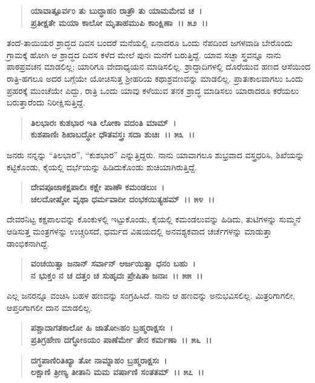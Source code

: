 \begin{verse}
\textbf{ಯಾವಾತ್ಪೂರ್ವಂ ತು ಬುದ್ಧಾಹಂ ರಾತ್ರೌ ತು ಯಾಮಮೇವ ಚ~।}\\\textbf{ಪ್ರತೀಕ್ಷತೇ ಮಯಾ ಕಾಲೋ ಮೃತಾಹಮುಪಿ ಕಾಂಕ್ಷಿಣಾ~।। ೫೨~।।}
\end{verse}

ತಂದೆ-ತಾಯಿಯರ ಶ್ರಾದ್ಧದ ದಿವಸ ಬಂದರೆ ಮನೆಯಲ್ಲಿ ಏನಾದರೂ ಒಂದು ನೆಪದಿಂದ ಜಗಳವಾಡಿ ಬೇರೊಂದು ಗ್ರಾಮಕ್ಕೆ ಹೋಗಿ ಆ ಶ್ರಾದ್ಧದ ದಿವಸ ಕಳೆದ ಮೇಲೆ ಪುನಃ ಮನೆಗೆ ಬರುತ್ತಿದ್ದೆ. ಯಾವ ಸಚ್ಛಾ ಸ್ತ್ರವನ್ನೂ ನಾನು ಪಾಠಪ್ರವಚನ ಮಾಡಲಿಲ್ಲ; ಯಾರಿಗೂ ವೇದಾಧ್ಯಯನ ಮಾಡಿಸಲಿಲ್ಲ. ಶ್ರಾದ್ಧಾದಿಗಳಲ್ಲಿ ದೊರೆಯುವ ಹಣದ ಆಸೆಯಿಂದ ರಾತ್ರಿ-ಹಗಲೂ ಅದರ ಬಗ್ಗೆಯೇ ಯೋಚಿಸುತ್ತ ಶ‍್ರೀಹರಿಯ ಕಥಾಶ್ರವಣವನ್ನು ಮಾಡಲಿಲ್ಲ. ಪ್ರಾತಃಕಾಲವಾಗಲು ಒಂದು ಪ್ರಹರಕ್ಕೆ ಮುಂಚೆಯೇ ಎದ್ದು, ರಾತ್ರಿ ಒಂದು ಯಾವು ಕಳೆಯುವ ತನಕ ಶ್ರಾದ್ಧ ಮಾಡಿಸಲು ಯಾರಾದರೂ ಕರೆಯಲು ಬರುತ್ತಾರೆಂದು ನಿರೀಕ್ಷಿಸುತ್ತಿದ್ದೆ.

\begin{verse}
\textbf{ತಿಲಭಾರಃ ಕುಶಭಾರ ಇತಿ ಲೋಕಾ ವದಂತಿ ಮಾಮ್~।}\\\textbf{ಕುಶಪಾಣಿಃ ಶಿಖಾಬದ್ಧೋ ಧೌತವಸ್ತ್ರಃ ಸದಾ ಶುಚಿಃ~।। ೫೩~।।}
\end{verse}

ಜನರು ನನ್ನನ್ನು “ತಿಲಭಾರ”, “ಕುಶಭಾರ” ಎನ್ನುತ್ತಿದ್ದರು. ನಾನು ಯಾವಾಗಲೂ ಶುಭ್ರವಾದ ವಸ್ತ್ರಧರಿಸಿ, ಶಿಖೆಯನ್ನು ಕಟ್ಟಿಕೊಂಡು, ಕೈಯಲ್ಲಿ ದರ್ಭೆಯನ್ನು ಹಿಡಿದುಕೊಂಡು ಶುಚಿಯಾಗಿರುತ್ತಿದ್ದೆ.

\begin{verse}
\textbf{ದೇವಪೂಜಾಕಕ್ಷಪಾಲಿಃ ಕಕ್ಷೇ ಪಾಣೌ ಕಮಂಡಲುಃ~।}\\\textbf{ಚಲದೋಷ್ಠೋ ವೃಥಾ ಧರ್ಮವಾದೀ ದಂಭಕಯಿತ್ಯಹಮ್~।। ೫೪~।।}
\end{verse}

ದೇವರನಿಟ್ಟ ಕಕ್ಷಪಾಲವನ್ನು ಕೊಂಕುಳಲ್ಲಿ ಇಟ್ಟುಕೊಂಡು, ಕೈಯಲ್ಲಿ ಕಮಂಡಲುವನ್ನು ಹಿಡಿದು, ತುಟಿಗಳನ್ನು ಸುಮ್ಮನೆ ಆಡಿಸುತ್ತ ಮಂತ್ರಗಳನ್ನು ಉಚ್ಚರಿಸದೆ, ಧರ್ಮದ ವಿಷಯದಲ್ಲಿ ಅನವಶ್ಯಕವಾದ ಚರ್ಚೆಗಳನ್ನು ಮಾಡುತ್ತಾ ಡಾಂಭಿಕನಾಗಿದ್ದೆ.

\begin{verse}
\textbf{ವಂಚಯಿತ್ವಾ ಜನಾನ್ ಸರ್ವಾನ್ ಆರ್ಜಯಿತ್ವಾ ಧನಂ ಬಹು~।}\\\textbf{ನ ಭುಕ್ತಂ ನ ಚ ದತ್ತಂ ಚ ಸುಹೃದಃ ಪ್ರೇಷಿತಾ ಜನಾಃ~।। ೫೫~।।}
\end{verse}

ಎಲ್ಲ ಜನರನ್ನೂ ವಂಚಿಸಿ ಬಹಳ ಹಣವನ್ನು ಸಂಗ್ರಹಿಸಿದೆ. ನಾನು ಆ ಹಣವನ್ನು ಅನುಭವಿಸಲಿಲ್ಲ. ಮಿತ್ರರಿಗಾಗಲೀ, ಆಪ್ತರಿಗಾಗಲೀ ದಾನ ಮಾಡಲಿಲ್ಲ.

\begin{verse}
\textbf{ಪಶ್ಚಾದಾಗತಕಾಲೋ ಹಿ ಜಾತೋsಹಂ ಬ್ರಹ್ಮರಾಕ್ಷಸಃ~।}\\\textbf{ಪ್ರತಿಗ್ರಹೇಣ ದಗ್ಧೋಽಯಂ ಪಾಣೆರ್ಮೇ ತೇನ ಕರ್ಮಣಾ~।। ೫೬~।।} 
\end{verse}

\begin{verse}
\textbf{ದಗ್ಧಪಾಣಿರಿತಿಖ್ಯಾ ತೋ ನಾಮ್ನಾಹಂ ಬ್ರಹ್ಮರಾಕ್ಷಸಃ~।}\\\textbf{ಲಕ್ಷಾಣಿ ತ್ರೀಣ್ಯ ತೀತಾನಿ ಮಮ ವರ್ಷಾಣಿ ಸಂತತಮ್~।। ೫೭~।। }
\end{verse}

